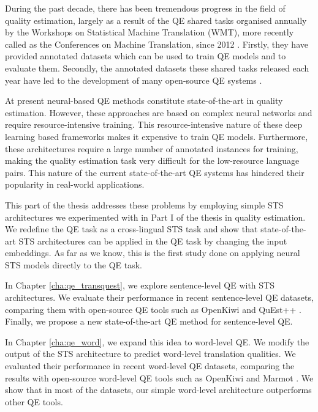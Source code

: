 During the past decade, there has been tremendous progress in the field of quality estimation, largely as a result of the QE shared tasks organised annually by the Workshops on Statistical Machine Translation (WMT), more recently called as the Conferences on Machine Translation, since 2012  \autocite{callison-burch-etal-2012-findings,bojar-etal-2013-findings,bojar-etal-2014-findings,bojar-etal-2015-findings,bojar-etal-2016-findings,bojar-etal-2017-findings,specia-etal-2018-findings,fonseca-etal-2019-findings,specia-etal-2020-findings-wmt}. Firstly, they have provided annotated datasets which can be used to train QE models and to evaluate them. Secondly, the annotated datasets these shared tasks released each year have led to the development of many open-source QE systems \autocite{specia-etal-2015-multi, ive-etal-2018-deepquest, kepler-etal-2019-openkiwi}. 

At present neural-based QE methods constitute state-of-the-art in quality estimation. However, these approaches are based on complex neural networks and require resource-intensive training. This resource-intensive nature of these deep learning based frameworks makes it expensive to train QE models. Furthermore, these architectures require a large number of annotated instances for training, making the quality estimation task very difficult for the low-resource language pairs. This nature of the current state-of-the-art QE systems has hindered their popularity in real-world applications.

This part of the thesis addresses these problems by employing simple STS architectures we experimented with in Part I of the thesis in quality estimation. We redefine the QE task as a cross-lingual STS task and show that state-of-the-art STS architectures can be applied in the QE task by changing the input embeddings. As far as we know, this is the first study done on applying neural STS models directly to the QE task. 

In Chapter \ref{cha:qe_transquest}, we explore sentence-level QE with STS architectures. We evaluate their performance in recent sentence-level QE datasets, comparing them with open-source QE tools such as OpenKiwi \autocite{kepler-etal-2019-openkiwi} and QuEst++ \autocite{specia-etal-2015-multi}. Finally, we propose a new state-of-the-art QE method for sentence-level QE.

In Chapter \ref{cha:qe_word}, we expand this idea to word-level QE. We modify the output of the STS architecture to predict word-level translation qualities. We evaluated their performance in recent word-level QE datasets, comparing the results with open-source word-level QE tools such as OpenKiwi \autocite{kepler-etal-2019-openkiwi} and Marmot \autocite{logacheva-etal-2016-marmot}. We show that in most of the datasets, our simple word-level architecture outperforms other QE tools. 

